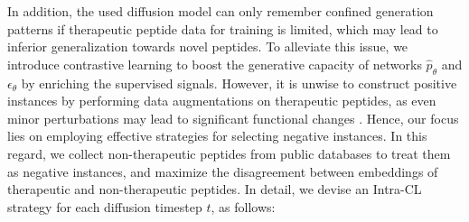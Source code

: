 \documentclass[letterpaper]{article} %
\begin{document}
In addition, the used diffusion model can only remember confined generation patterns if therapeutic peptide data for training is limited, which may lead to inferior generalization towards novel peptides. To alleviate this issue, we introduce contrastive learning to boost the generative capacity of networks ${\hat{p}}_\theta$ and $\epsilon_\theta$ by enriching the supervised signals. However, it is unwise to construct positive instances by performing data augmentations on therapeutic peptides, as even minor perturbations may lead to significant functional changes \cite{yadav2022structural}. Hence, our focus lies on employing effective strategies for selecting negative instances. In this regard, we collect non-therapeutic peptides from public databases to treat them as negative instances, and maximize the disagreement between embeddings of therapeutic and non-therapeutic peptides. In detail, we devise an Intra-CL strategy for each diffusion timestep $t$, as follows:
\end{document}
